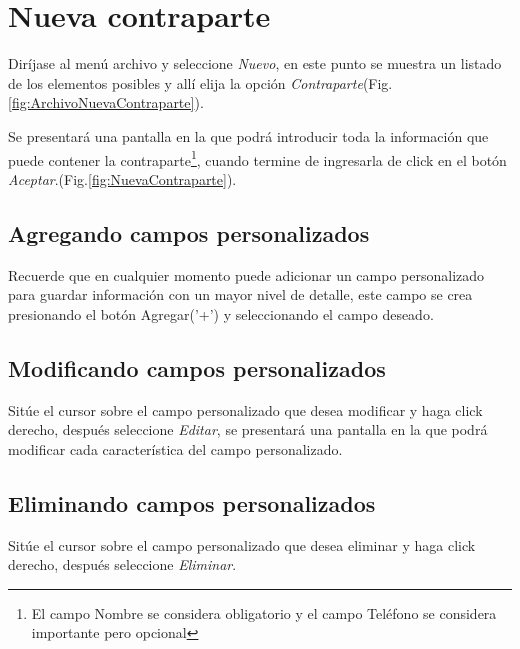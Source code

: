 \section{Nueva contraparte}
\label{sec:nuevaContraparte}
Dir\'ijase al men\'u archivo y seleccione \emph{Nuevo}, en este punto se muestra un listado de los elementos posibles y
all\'i elija la opci\'on \emph{Contraparte}(Fig.\ref{fig:ArchivoNuevaContraparte}). 
  

Se presentar\'a una pantalla en la que podr\'a introducir toda la informaci\'on
que puede contener la contraparte\footnote{El campo Nombre se considera obligatorio y el campo Tel\'efono se
considera importante pero opcional},
cuando termine de ingresarla de click en el bot\'on \emph{Aceptar}.(Fig.\ref{fig:NuevaContraparte}). 
  

\subsection{Agregando campos personalizados}
\label{sec:agregarCamposContraparte}
Recuerde que en cualquier momento puede adicionar un campo personalizado para guardar informaci\'on con un mayor nivel de detalle, este campo se crea presionando el bot\'on Agregar('+') y seleccionando el campo deseado.

\subsection{Modificando campos personalizados}
\label{sec:modificarCamposContraparte}
Sit\'ue el cursor sobre el campo personalizado que desea modificar y haga click derecho, despu\'es seleccione \emph{Editar},
se presentar\'a una pantalla en la que podr\'a modificar cada caracter\'istica
del campo personalizado.

\subsection{Eliminando campos personalizados}
\label{sec:eliminarCamposContraparte}
Sit\'ue el cursor sobre el campo personalizado que desea eliminar y haga click derecho, despu\'es seleccione \emph{Eliminar}.